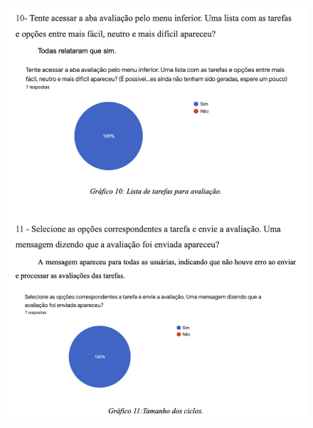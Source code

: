 \begin{apendicesenv}
\begin{figure}[ht]
        \includegraphics[keepaspectratio=true,scale=0.8]{figuras/ap6.png}
    \end{figure}
    \begin{figure}[ht]
        \centering

\end{figure}
\end{apendicesenv}

